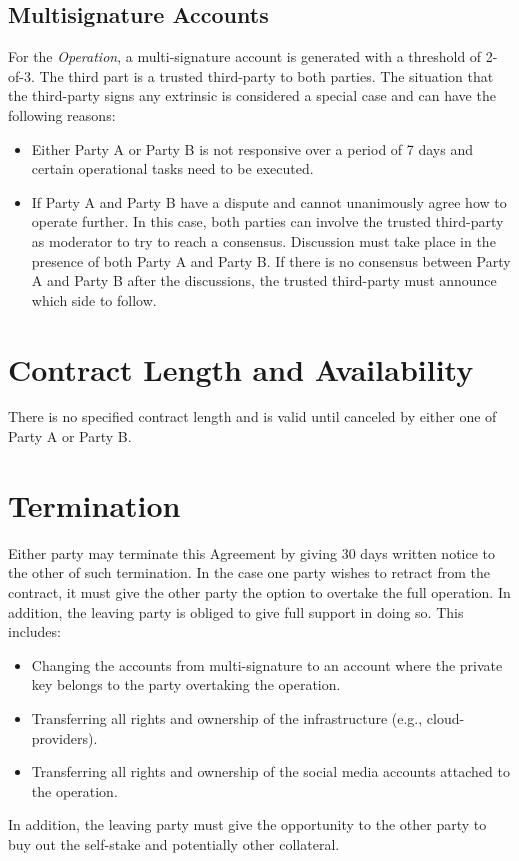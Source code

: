 \documentclass[10pt]{article}
\begin{document}
\subsection{Multisignature Accounts}
For the \textit{Operation}, a multi-signature account is generated with a threshold of 2-of-3. The third part is a trusted third-party to both parties. The situation that the third-party signs any extrinsic is considered a special case and can have the following reasons:

\begin{itemize}
    \item Either Party A or Party B is not responsive over a period of 7 days and certain operational tasks need to be executed.
    \item If Party A and Party B have a dispute and cannot unanimously agree how to operate further. In this case, both parties can involve the trusted third-party as moderator to try to reach a consensus. Discussion must take place in the presence of both Party A and Party B. If there is no consensus between Party A and Party B after the discussions, the trusted third-party must announce which side to follow.
\end{itemize}

\section{Contract Length and Availability}

There is no specified contract length and is valid until canceled by either one of Party A or Party B.

\section{Termination}

Either party may terminate this Agreement by giving 30 days written notice to the other of such termination. In the case one party wishes to retract from the contract, it must give the other party the option to overtake the full operation. In addition, the leaving party is obliged to give full support in doing so. This includes:
\begin{itemize}
    \item Changing the accounts from multi-signature to an account where the private key belongs to the party overtaking the operation.
    \item Transferring all rights and ownership of the infrastructure (e.g., cloud-providers).
     \item Transferring all rights and ownership of the social media accounts attached to the operation.
\end{itemize}
In addition, the leaving party must give the opportunity to the other party to buy out the self-stake and potentially other collateral. 
\end{document}
